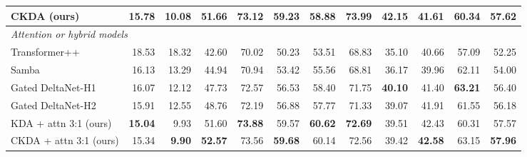 \begin{table}[t]
\begin{tabular}{lrrrrrrrrrrr}
    CKDA (ours) & 15.78 & \textbf{10.08} & \textbf{51.66} & \textbf{73.12} & 59.23 & 58.88 & \textbf{73.99} & \textbf{42.15} & \textbf{41.61} & 60.34 & \textbf{57.62} \\
    \midrule
    \multicolumn{12}{l}{\textit{Attention or hybrid models}} \\
    Transformer++ & 18.53 & 18.32 & 42.60 & 70.02 & 50.23 & 53.51 & 68.83 & 35.10 & 40.66 & 57.09 & 52.25 \\
    Samba & 16.13 & 13.29 & 44.94 & 70.94 & 53.42 & 55.56 & 68.81 & 36.17 & 39.96 & 62.11 & 54.00 \\
    Gated DeltaNet-H1 & 16.07 & 12.12 & 47.73 & 72.57 & 56.53 & 58.40 & 71.75 & \textbf{40.10} & 41.40 & \textbf{63.21} & 56.40 \\
    Gated DeltaNet-H2 & 15.91 & 12.55 & 48.76 & 72.19 & 56.88 & 57.77 & 71.33 & 39.07 & 41.91 & 61.55 & 56.18 \\
    KDA + attn 3:1 (ours) & \textbf{15.04} & 9.93 & 51.60 & \textbf{73.88} & 59.57 & \textbf{60.62} & \textbf{72.69} & 39.51 & 42.43 & 60.31 & 57.57 \\
    CKDA + attn 3:1 (ours) & 15.34 & \textbf{9.90} & \textbf{52.57} & 73.56 & \textbf{59.68} & 60.14 & 72.56 & 39.42 & \textbf{42.58} & 63.15 & \textbf{57.96} \\
    \bottomrule
  \end{tabular}
\end{table}
%
